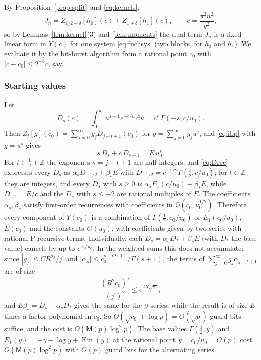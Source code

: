 \documentclass[11pt]{amsart}
\theoremstyle{definition}
\theoremstyle{remark}
\newcommand{\Ein}{\operatorname{Ein}}
\newcommand{\dd}{\,\mathrm{d}}
\newcommand{\QQ}{\mathbb{Q}}
\newcommand{\ZZ}{\mathbb{Z}}
\newcommand{\Mul}{\mathsf{M}}
\begin{document}
By Proposition~\ref{prop:split} and \eqref{eq:kernels},
\[
  J_n = Z_{1/2+\delta}[h_0](c) + Z_{1+\delta}[h_1](c), \qquad c = \frac{\pi^2n^2}{q^2},
\]
so by Lemmas~\ref{lem:kernel}(3) and~\ref{lem:moments} the dual term $J_n$ is a
fixed linear form in $Y(c)$ for one system \eqref{eq:fuchsys} (two blocks, for $h_0$ and $h_1$). We evaluate
it by the bit-burst algorithm from a rational point $c_0$ with $|c - c_0| \le 2^{-8}c$, say.

\subsubsection{Starting values} Let
\[
  D_s(c) = \int_0^{u_0}u^{s-1}e^{-c/u}\dd u = c^s\,\Gamma(-s, c/u_0).
\]
Then $Z_t[g](c_0) = \sum_{j=0}^{\infty} g_j D_{j-t+1}(c_0)$ for $g = \sum_{j=0}^{\infty} g_j u^j$, and \eqref{eq:ibp} with $g = u^s$ gives
\begin{equation}\label{eq:Drec}
  s\, D_s + c\, D_{s-1} = E\, u_0^s .
\end{equation}
For $t \in \frac12 + \ZZ$ the exponents $s = j - t + 1$ are half-integers, and \eqref{eq:Drec} expresses every
$D_s$ as $\alpha_s D_{-1/2} + \beta_s E$ with $D_{-1/2} = c^{-1/2}\Gamma(\frac12, c/u_0)$; for $t \in \ZZ$ they are integers,
and every $D_s$ with $s \ge 0$ is $\alpha_sE_1(c/u_0) + \beta_sE$, while $D_{-1} = E/c$ and the $D_s$ with $s \le -2$
are rational multiples of $E$. The coefficients
$\alpha_s, \beta_s$ satisfy first-order recurrences with coefficients in $\QQ(c_0, u_0^{1/2})$. Therefore every
component of $Y(c_0)$ is a combination of $\Gamma(\frac12, c_0/u_0)$ or $E_1(c_0/u_0)$, $E(c_0)$ and the constants
$G(u_0)$, with coefficients given by two series with rational P-recursive terms. Individually, each
$D_s = \alpha_sD_* + \beta_sE$ (with $D_*$ the base value) cancels by up to $e^{c_0/u_0}$. In the weighted sums this
does not accumulate: since $|g_j| \le CR^{2j}/j!$ and $|\alpha_s| \le c_0^{s+O(1)}/\Gamma(s+1)$, the terms of
$\sum_{j=0}^{\infty} g_j\alpha_{j-t+1}$ are of size
\[
  \frac{(R^2c_0)^j}{(j!)^2} \le e^{2R\sqrt{c_0}},
\]
and $E\beta_s = D_s - \alpha_s D_*$ gives the same for the $\beta$-series, while the result is of size $E$ times a factor
polynomial in $c_0$. So $O(\sqrt{c_0} + \log p) = O(\sqrt p)$ guard bits suffice, and the cost is $O(\Mul(p)\log^2p)$.
The base values $\Gamma(\frac12, y)$ and $E_1(y) = -\gamma - \log y + \Ein(y)$ at the rational point $y = c_0/u_0 = O(p)$
cost $O(\Mul(p)\log^2 p)$ with $O(p)$ guard bits for the alternating series.
\end{document}
